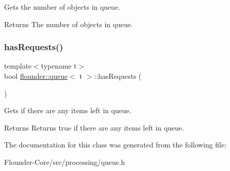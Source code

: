 Gets the number of objects in queue. 

\begin{DoxyReturn}{Returns}
The number of objects in queue. 
\end{DoxyReturn}
\mbox{\label{classflounder_1_1queue_adab970a13d2ff675a64848c99d2ba12a}} 
\subsubsection{\texorpdfstring{has\+Requests()}{hasRequests()}}
{\footnotesize\ttfamily template$<$typename t$>$ \\
bool \hyperlink{classflounder_1_1queue}{flounder\+::queue}$<$ t $>$\+::has\+Requests (\begin{DoxyParamCaption}{ }\end{DoxyParamCaption})\hspace{0.3cm}{\ttfamily [inline]}}



Gets if there are any items left in queue. 

\begin{DoxyReturn}{Returns}
Returns true if there are any items left in queue. 
\end{DoxyReturn}


The documentation for this class was generated from the following file\+:\begin{DoxyCompactItemize}
\item 
Flounder-\/\+Core/src/processing/queue.\+h\end{DoxyCompactItemize}
